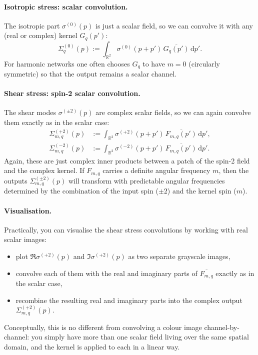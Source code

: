 \documentclass[12pt]{article}
\begin{document}
\paragraph{Isotropic stress: scalar convolution.}
The isotropic part $\sigma^{(0)}(p)$ is just a scalar field, so we can
convolve it with any (real or complex) kernel $G_q(p')$:
\begin{equation}
  \label{eq:isotropic-stress-conv}
  \Sigma^{(0)}_q(p)
  :=
  \int_{\mathbb{R}^2}
    \sigma^{(0)}(p+p')\,\overline{G_q(p')}\,\mathrm{d}p'.
\end{equation}
For harmonic networks one often chooses $G_q$ to have $m=0$
(circularly symmetric) so that the output remains a scalar channel.

\paragraph{Shear stress: spin-2 scalar convolution.}
The shear modes $\sigma^{(\pm2)}(p)$ are complex scalar fields, so we
can again convolve them exactly as in the scalar case:
\begin{align}
  \Sigma^{(+2)}_{m,q}(p)
  &:=
  \int_{\mathbb{R}^2}
    \sigma^{(+2)}(p+p')\,\overline{F_{m,q}(p')}\,\mathrm{d}p',
  \label{eq:shear-plus-conv}
  \\
  \Sigma^{(-2)}_{m,q}(p)
  &:=
  \int_{\mathbb{R}^2}
    \sigma^{(-2)}(p+p')\,\overline{F_{m,q}(p')}\,\mathrm{d}p'.
  \label{eq:shear-minus-conv}
\end{align}
Again, these are just complex inner products between a patch of the
spin-2 field and the complex kernel. If $F_{m,q}$ carries a definite
angular frequency $m$, then the outputs
$\Sigma^{(\pm2)}_{m,q}(p)$ will transform with predictable angular
frequencies determined by the combination of the input spin ($\pm2$)
and the kernel spin ($m$).

\paragraph{Visualisation.}
Practically, you can visualise the shear stress convolutions by
working with real scalar images:
\begin{itemize}
  \item plot $\Re\sigma^{(+2)}(p)$ and $\Im\sigma^{(+2)}(p)$ as two
        separate grayscale images,
  \item convolve each of them with the real and imaginary parts of
        $\overline{F_{m,q}}$ exactly as in the scalar case,
  \item recombine the resulting real and imaginary parts into the
        complex output $\Sigma^{(+2)}_{m,q}(p)$.
\end{itemize}
Conceptually, this is no different from convolving a colour image
channel-by-channel: you simply have more than one scalar field living
over the same spatial domain, and the kernel is applied to each in a
linear way.
\end{document}
